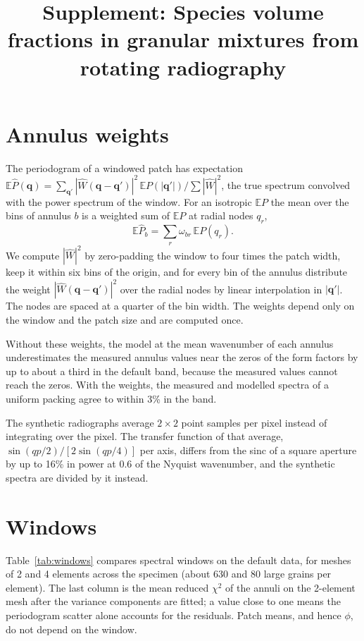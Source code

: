 \documentclass[11pt]{article}
\title{Supplement: Species volume fractions in granular mixtures from rotating radiography}
\author{}
\date{}
\begin{document}
\maketitle

\section{Annulus weights}\label{sec:window}

The periodogram of a windowed patch has expectation
$\mathbb{E}\hat P(\bm q)=\sum_{\bm q'}|\hat W(\bm q-\bm q')|^2\,\mathbb{E}P(|\bm q'|)/\sum|\hat W|^2$,
the true spectrum convolved with the power spectrum of the window. For an
isotropic $\mathbb{E}P$ the mean over the bins of annulus $b$ is a weighted
sum of $\mathbb{E}P$ at radial nodes $q_r$,
\begin{equation}
\mathbb{E}\hat P_b=\sum_r\omega_{br}\,\mathbb{E}P(q_r).
\end{equation}
We compute $|\hat W|^2$ by zero-padding the window to four times the patch
width, keep it within six bins of the origin, and for every bin of the
annulus distribute the weight $|\hat W(\bm q-\bm q')|^2$ over the radial
nodes by linear interpolation in $|\bm q'|$. The nodes are spaced at a
quarter of the bin width. The weights depend only on the window and the
patch size and are computed once.

Without these weights, the model at the mean wavenumber of each annulus
underestimates the measured annulus values near the zeros of the form
factors by up to about a third in the default band, because the measured
values cannot reach the zeros. With the weights, the measured and modelled
spectra of a uniform packing agree to within 3\% in the band.

The synthetic radiographs average $2\times2$ point samples per pixel instead
of integrating over the pixel. The transfer function of that average,
$\sin(qp/2)/[2\sin(qp/4)]$ per axis, differs from the sinc of a square
aperture by up to 16\% in power at $0.6$ of the Nyquist wavenumber, and the
synthetic spectra are divided by it instead.

\section{Windows}\label{sec:windows}

Table~\ref{tab:windows} compares spectral windows on the default data,
for meshes of 2 and 4 elements across the specimen (about 630 and 80 large
grains per element). The last column is the mean reduced $\chi^2$ of the
annuli on the 2-element mesh after the variance components are fitted; a
value close to one means the periodogram scatter alone accounts for the
residuals. Patch means, and hence $\phi$, do not depend on the window.
\end{document}
